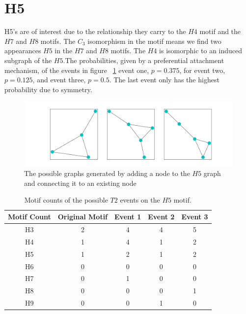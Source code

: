 \FloatBarrier


\section{H5}
H5's are of interest due to the relationship they carry to the $H4$ motif and the 
$H7$ and $H8$ motifs. The $C_3$ isomorphism in the motif means we find two appearances
$H5$ in the $H7$ and $H8$ motifs. The $H4$ is isomorphic to an induced subgraph of the $H5$.The probabilities, given by 
 a preferential attachment mechanism, of the events
  in figure ~\ref{fig:H5T2} event one, $p=0.375$, for event two, $p=0.125$, and event three, $p=0.5$. The last event
only has the highest probability due to symmetry.

\begin{figure}[!ht]
    \includegraphics[width=12cm]{Images/H5_evolution.png}
    \centering
    \caption{The possible graphs generated by adding a node to the $H5$ graph 
    and connecting it to an existing node}
    \label{fig:H5T2}
\end{figure}
\FloatBarrier

\begin{table}
    \centering
    \begin{tabular}{||c c c c c||} 
    \hline
    Motif Count & Original Motif & Event 1 & Event 2 & Event 3\\ [0.5ex] 
    \hline\hline
    H3 & 2 & 4 & 4 & 5\\ 
    \hline
    H4 & 1 & 4 & 1 & 2\\
    \hline
    H5 & 1 & 2 & 1 & 2\\
    \hline
    H6 & 0 & 0 & 0 & 0 \\
    \hline
    H7 & 0 & 1 & 0 & 0 \\
    \hline
    H8 & 0 & 0 & 0 & 1\\
    \hline
    H9 & 0 & 0 & 1 & 0\\
    \hline
   \end{tabular}
   \caption{Motif counts of the possible $T2$ events on the $H5$ motif.}
    \label{table:3}
\end{table}


